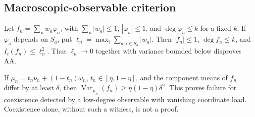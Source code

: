 \subsection{Macroscopic-observable
criterion}\label{proof:higher_order_obstructions:macroscopic-observable-criterion}

Let \(f_{n} = \sum_{a}w_{a}\varphi _{a}\), with
\(\sum_{a}|w_{a}| \le  1\), \(|\varphi _{a}| \le  1\), and
\(\operatorname{deg} \varphi _{a} \le  k\) for a fixed \(k\). If
\(\varphi _{a}\) depends on \(S_{a}\), put
\(\ell_n=\max_i\sum_{a:i\in S_a}|w_a|\). Then \(|f_{n}| \le  1\),
\(\operatorname{deg} f_{n} \le  k\), and
\(I_{i}(f_{n}) \le  \ell _{n}^{2}\). Thus \(\ell _{n} \to  0\) together
with variance bounded below disproves AA.

If \(\mu _{n} = t_{n}\nu _{n}+(1-t_{n})\omega _{n}\),
\(t_{n} \in  [\eta ,1-\eta ]\), and the component means of \(f_{n}\)
differ by at least \(\delta\), then
\(\operatorname{Var}_{\mu_n}(f_{n}) \ge  \eta (1-\eta )\delta ^{2}\).
This proves failure for coexistence detected by a low-degree observable
with vanishing coordinate load. Coexistence alone, without such a
witness, is not a proof.
